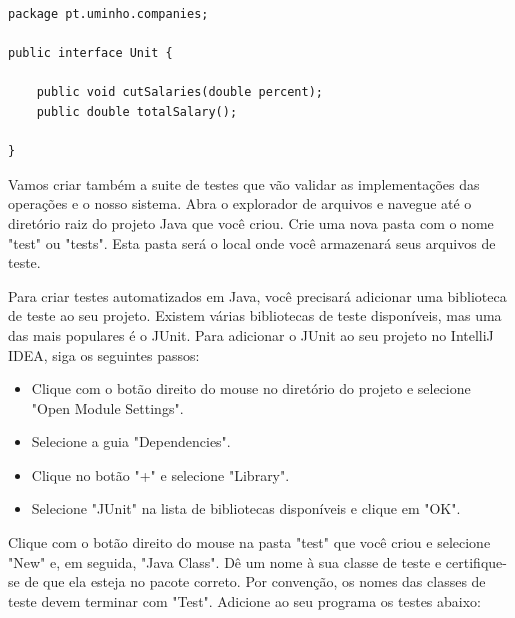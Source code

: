 \documentclass{article}
\begin{document}
\begin{lstlisting}[caption={Interface Unit},label={anoniTolambda},captionpos=t]
package pt.uminho.companies;

public interface Unit {
	
	public void cutSalaries(double percent);
	public double totalSalary();

}
\end{lstlisting}


Vamos criar também a suite de testes que vão validar as implementações das operações e o nosso sistema. Abra o explorador de arquivos e navegue até o diretório raiz do projeto Java que você criou. Crie uma nova pasta com o nome "test" ou "tests". Esta pasta será o local onde você armazenará seus arquivos de teste.

Para criar testes automatizados em Java, você precisará adicionar uma biblioteca de teste ao seu projeto. Existem várias bibliotecas de teste disponíveis, mas uma das mais populares é o JUnit. Para adicionar o JUnit ao seu projeto no IntelliJ IDEA, siga os seguintes passos:

\begin{itemize}
    \item Clique com o botão direito do mouse no diretório do projeto e selecione "Open Module Settings".
    \item Selecione a guia "Dependencies".
    \item Clique no botão "+" e selecione "Library".
    \item Selecione "JUnit" na lista de bibliotecas disponíveis e clique em "OK".
\end{itemize}

Clique com o botão direito do mouse na pasta "test" que você criou e selecione "New" e, em seguida, "Java Class". Dê um nome à sua classe de teste e certifique-se de que ela esteja no pacote correto. Por convenção, os nomes das classes de teste devem terminar com "Test". Adicione ao seu programa os testes abaixo:
\end{document}
